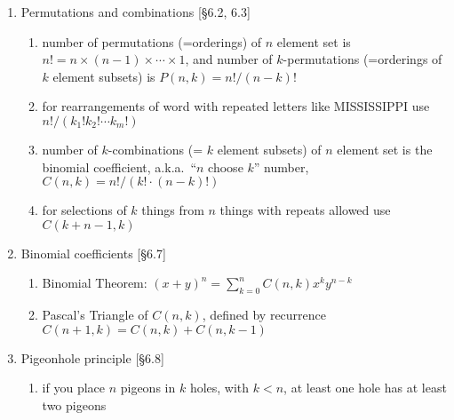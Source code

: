 \documentclass[11pt]{article}
\begin{document}
\begin{enumerate}
\item Permutations and combinations [\S6.2, 6.3]
\begin{enumerate}
\item number of permutations (=orderings) of $n$ element set is $n! = n \times (n-1) \times \cdots \times 1$, and number of $k$-permutations (=orderings of $k$ element subsets) is $P(n,k) = n!/(n-k)!$
\item for rearrangements of word with repeated letters like MISSISSIPPI use $n! / (k_1! k_2! \cdots k_m !)$
\item number of $k$-combinations (= $k$ element subsets) of $n$ element set is the binomial coefficient, a.k.a.~``$n$ choose $k$'' number, $C(n,k) = n!/( k! \cdot (n-k)! )$
\item for selections of $k$ things from $n$ things with repeats allowed use $C(k+n-1,k)$
\end{enumerate}

\item Binomial coefficients [\S 6.7]
\begin{enumerate}
\item Binomial Theorem: $(x+y)^n = \sum_{k=0}^{n} C(n,k) x^k y^{n-k}$
\item Pascal's Triangle of $C(n,k)$, defined by recurrence $C(n+1,k) = C(n,k) + C(n,k-1)$
\end{enumerate}


\item Pigeonhole principle [\S6.8]
\begin{enumerate}
\item if you place $n$ pigeons in $k$ holes, with $k < n$, at least one hole has at least two pigeons
\end{enumerate}

\end{enumerate}
\end{document}
